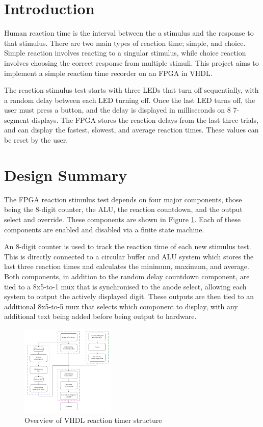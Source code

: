 \documentclass[12pt]{article}
\begin{document}
\newpage
{}

\section{Introduction}

Human reaction time is the interval between the a stimulus and the response to that stimulus. There are two main types of reaction time; simple, and choice. Simple reaction involves reacting to a singular stimulus, while choice reaction involves choosing the correct response from multiple stimuli. This project aims to implement a simple reaction time recorder on an FPGA in VHDL.

The reaction stimulus test starts with three LEDs that turn off sequentially, with a random delay between each LED turning off. Once the last LED turns off, the user must press a button, and the delay is displayed in milliseconds on 8 7-segment displays. The FPGA stores the reaction delays from the last three trials, and can display the fastest, slowest, and average reaction times. These values can be reset by the user.

\section{Design Summary}

The FPGA reaction stimulus test depends on four major components, those being the 8-digit counter, the ALU, the reaction countdown, and the output select and override. These components are shown in Figure \ref{project_structure}. Each of these components are enabled and disabled via a finite state machine.

An 8-digit counter is used to track the reaction time of each new stimulus test. This is directly connected to a circular buffer and ALU system which stores the last three reaction times and calculates the minimum, maximum, and average. Both components, in addition to the random delay countdown component, are tied to a 8x5-to-1 mux that is synchronised to the anode select, allowing each system to output the actively displayed digit. These outputs are then tied to an additional 8x5-to-5 mux that selects which component to display, with any additional text being added before being output to hardware.

\begin{figure}[H]
    \centering
    \includegraphics[width=0.4\textwidth]{../figures/project_overall_structure.png}
    \caption{Overview of VHDL reaction timer structure}
    \label{project_structure}
\end{figure}
\end{document}
